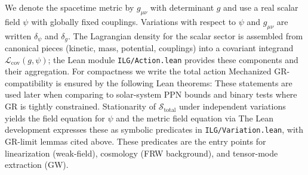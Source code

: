 \documentclass[aps,prd,twocolumn,superscriptaddress,nofootinbib,floatfix,longbibliography]{revtex4-2}
\newcommand{\dd}{\mathrm{d}}
\newcommand{\Lag}{\mathcal{L}}
\newcommand{\Action}{\mathcal{S}}
\newcommand{\lean}[1]{\texttt{\detokenize{#1}}}
\begin{document}
We denote the spacetime metric by $g_{\mu\nu}$ with determinant $g$ and use a real scalar field $\psi$ with globally fixed couplings. Variations with respect to $\psi$ and $g_{\mu\nu}$ are written $\delta_\psi$ and $\delta_g$. The Lagrangian density for the scalar sector is assembled from canonical pieces (kinetic, mass, potential, couplings) into a covariant integrand $\Lag_{\mathrm{cov}}(g,\psi)$; the Lean module \texttt{ILG/Action.lean} provides these components and their aggregation. For compactness we write the total action
%
Mechanized GR-compatibility is ensured by the following Lean theorems:
These statements are used later when comparing to solar-system PPN bounds and binary tests where GR is tightly constrained.
%
Stationarity of $\Action_{\mathrm{total}}$ under independent variations yields the field equation for $\psi$ and the metric field equation via
The Lean development expresses these as symbolic predicates in \texttt{ILG/Variation.lean}, with GR-limit lemmas cited above. These predicates are the entry points for linearization (weak-field), cosmology (FRW background), and tensor-mode extraction (GW).
\end{document}
